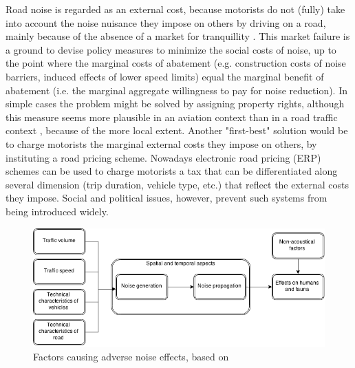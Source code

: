 \documentclass[12pt]{scrartcl}
\begin{document}
		Road noise is regarded as an external cost, because motorists do not (fully) take into account the noise nuisance they impose on others by driving on a road, mainly because of the absence of a market for tranquillity \citep{Nelson2008}. This market failure is a ground to devise policy measures to minimize the social costs of noise, up to the point where the marginal costs of abatement (e.g. construction costs of noise barriers, induced effects of lower speed limits) equal the marginal benefit of abatement (i.e. the marginal aggregate willingness to pay for noise reduction). In simple cases the problem might be solved by assigning property rights, although this measure seems more plausible in an aviation context than in a road traffic context \citep{Gillen2003}, because of the more local extent. Another "first-best" solution would be to charge motorists the marginal external costs they impose on others, by instituting a road pricing scheme. Nowadays electronic road pricing (ERP) schemes can be used to charge motorists a tax that can be differentiated along several dimension (trip duration, vehicle type, etc.) that reflect the external costs they impose\citep{Verhoef1995}. Social and political issues, however, prevent such systems from being introduced widely. 
	
		\begin{figure}[h]
			\caption{Factors causing adverse noise effects, based on \cite{Nijland2003}}
			\label{fig:NoiseEffects}
			\centering
			\includegraphics[width=\textwidth]{Graph0}
		\end{figure}
	
\end{document}
